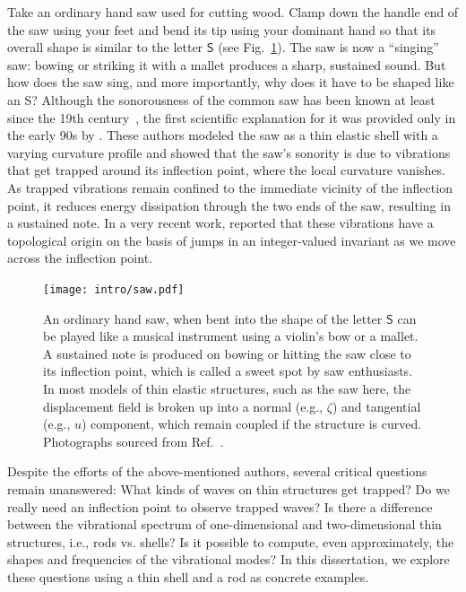 Take an ordinary hand saw used for cutting wood.
Clamp down the handle end of the saw using your feet and bend its tip using your dominant hand so that its overall shape is similar to the letter $\mathsf{S}$ (see Fig.~\ref{fig:saw}).
The saw is now a ``singing'' saw: bowing or striking it with a mallet produces a sharp, sustained sound.
But how does the saw sing, and more importantly, why does it have to be shaped like an \textsf{S}?
Although the sonorousness of the common saw has been known at least since the 19th century~\cite{stuckenbruck2016}, the first scientific explanation for it was provided only in the early 90s by \citet{scott1992}.
These authors modeled the saw as a thin elastic shell with a varying curvature profile and showed that the saw's sonority is due to vibrations that get trapped around its inflection point, where the local curvature vanishes.
As trapped vibrations remain confined to the immediate vicinity of the inflection point, it reduces energy dissipation through the two ends of the saw, resulting in a sustained note.
In a very recent work, \citet{shankar2022} reported that these vibrations have a topological origin on the basis of jumps in an integer-valued invariant as we move across the inflection point.
%
\begin{figure}
  \begin{center}
    \texttt{[image: intro/saw.pdf]}
  \end{center}
  \caption{%
    An ordinary hand saw, when bent into the shape of the letter $\mathsf{S}$ can be played like a musical instrument using a violin's bow or a mallet.
    A sustained note is produced on bowing or hitting the saw close to its inflection point, which is called a sweet spot by saw enthusiasts.
    In most models of thin elastic structures, such as the saw here, the displacement field is broken up into a normal (e.g., $\zeta$) and tangential (e.g., $u$) component, which remain coupled if the structure is curved.
    Photographs sourced from Ref.~\cite{shankar2022}.
  }
  \label{fig:saw}
\end{figure}


Despite the efforts of the above-mentioned authors, several critical questions remain unanswered:
What kinds of waves on thin structures get trapped?
Do we really need an inflection point to observe trapped waves?  Is there a difference between the vibrational spectrum of one-dimensional and two-dimensional thin structures, i.e., rods vs. shells?
Is it possible to compute, even approximately, the shapes and frequencies of the vibrational modes?
In this dissertation, we explore these questions using a thin shell and a rod as concrete examples.

